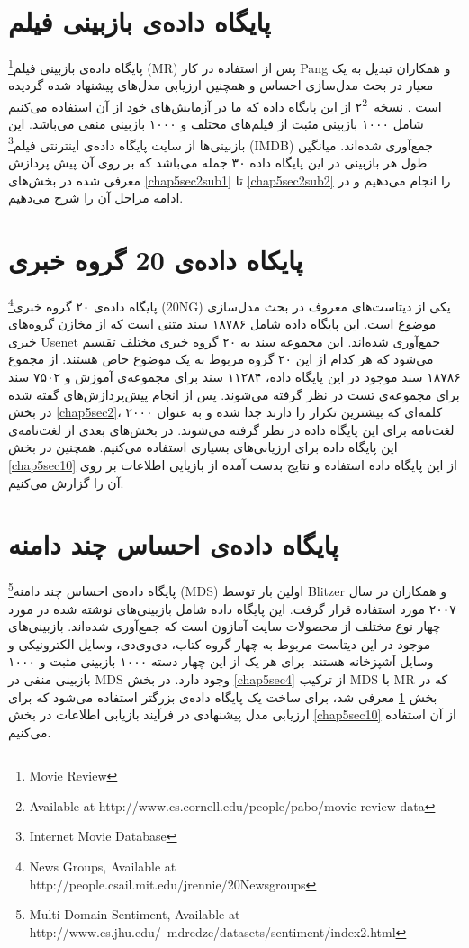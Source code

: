 \section{پایگاه داده‌ی بازبینی فیلم}
\label{chap5sec3}
پایگاه داد‌ه‌ی بازبینی فیلم\footnote{Movie Review}
(MR)
 پس از استفاده در کار
Pang
و همکاران
\cite{pang2002thumbs}
تبدیل به یک معیار در بحث مدل‌سازی احساس و همچنین ارزیابی مدل‌های پیشنهاد شده گردیده است
\cite{lin2012weakly}.
نسخه~۲\footnote{Available at http://www.cs.cornell.edu/people/pabo/movie-review-data}
از این پایگاه داده که ما در آزمایش‌های خود از آن استفاده می‌‌کنیم شامل ۱۰۰۰ بازبینی مثبت از فیلم‌های مختلف و ۱۰۰۰ بازبینی منفی‌ می‌‌باشد. این بازبینی‌ها از سایت پایگاه داد‌ه‌ی اینترنتی فیلم\footnote{Internet Movie Database}
(IMDB)
جمع‌آوری شده‌اند. میانگین طول هر بازبینی در این پایگاه داده ۳۰ جمله می‌‌باشد که بر روی آن پیش پردازش معرفی شده در بخش‌های
\ref{chap5sec2sub1}
تا 
\ref{chap5sec2sub2}
 را انجام می‌دهیم  و در ادامه مراحل آن را شرح می‌دهیم.
 
 
 \section{پایکاه داده‌ی 20 گروه خبری}
 \label{chap5sec11}
 پایگاه داده‌ی ۲۰ گروه خبری\footnote{News Groups, Available at http://people.csail.mit.edu/jrennie/20Newsgroups}
(20NG)
 یکی‌ از دیتاست‌های معروف در بحث مدل‌سازی موضوع است. این پایگاه داده شامل ۱۸۷۸۶ سند متنی است که از مخازن گروه‌های خبری
 Usenet
 جمع‌آوری شده‌اند. این مجموعه سند به ۲۰ گروه خبری مختلف تقسیم می‌‌شود که هر کدام از این ۲۰ گروه مربوط به یک موضوع خاص هستند. از مجموع ۱۸۷۸۶ سند موجود در این پایگاه داده، ۱۱۲۸۴ سند برای مجموعه‌ی آموزش و ۷۵۰۲ سند برای مجموعه‌ی تست در نظر گرفته می‌‌شوند. پس از انجام پیش‌پردازش‌های گفته‌ شده در بخش
 \ref{chap5sec2}،
 ۲۰۰۰ کلمه‌ای‌ که بیشترین تکرار را دارند جدا شده و به عنوان لغت‌نامه برای این پایگاه داده در نظر گرفته می‌‌شوند. در بخش‌های بعدی از لغت‌نامه‌ی این پایگاه داده برای ارزیابی‌های بسیاری استفاده می‌کنیم. همچنین در بخش 
 \ref{chap5sec10}
 از این پایگاه داده استفاده و نتایج بدست آمده از بازیایی اطلاعات بر روی آن را گزارش می‌کنیم.
 
 \section{پایگاه داده‌ی احساس چند دامنه}
 \label{chap5sec12}
 پایگاه داده‌‌ی احساس چند دامنه\footnote{Multi Domain Sentiment, Available at http://www.cs.jhu.edu/~mdredze/datasets/sentiment/index2.html}
 (MDS)
 اولین بار توسط
 Blitzer
 و همکاران
 \cite{blitzer2007biographies}
 در سال ۲۰۰۷ مورد استفاده قرار گرفت. این پایگاه داده شامل بازبینی‌های نوشته شده در مورد چهار نوع مختلف از محصولات سایت آمازون است که جمع‌آوری شده‌اند.  بازبینی‌های موجود در این دیتاست مربوط به چهار گروه کتاب، دی‌وی‌دی، وسایل الکترونیکی‌ و وسایل آشپزخانه هستند. برای هر یک از این چهار دسته ۱۰۰۰ بازبینی مثبت و ۱۰۰۰ بازبینی منفی‌ در
 MDS
 وجود دارد. در بخش
 \ref{chap5sec4}
 از ترکیب
 MDS
 با
 MR
 که در بخش
 \ref{chap5sec3}
 معرفی‌ شد، برای ساخت یک پایگاه داده‌ی بزرگتر استفاده می‌‌شود که برای ارزیابی مدل پیشنهادی در فرآیند بازیابی اطلاعات در بخش
 \ref{chap5sec10}
 از آن استفاده می‌‌کنیم.

